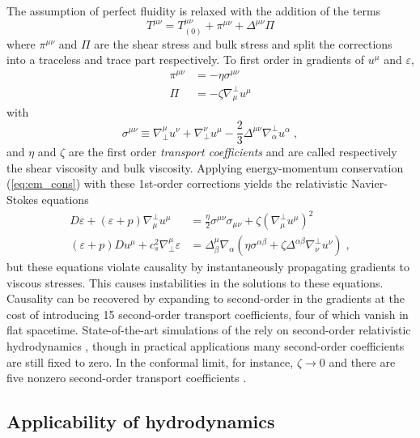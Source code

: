 The assumption of perfect fluidity is relaxed with the addition of the terms
\begin{equation}
T^{\mu\nu} = T^{\mu\nu}_{(0)} + \pi^{\mu\nu} + \Delta^{\mu\nu}\Pi
\end{equation}
where $\pi^{\mu\nu}$ and $\Pi$ are the shear stress and bulk stress and split the corrections into a traceless and trace part respectively.
To first order in gradients of $u^\mu$ and $\varepsilon$,
\begin{align}
  \label{eq:shear_stress}
  \pi^{\mu\nu} &= - \eta \sigma^{\mu\nu} \\
  \label{eq:bulk_stress}
  \Pi          &= - \zeta \nabla^\perp_\mu u^\mu
\end{align}
with
\begin{equation}
  \label{eq:sigma_tensor}
  \sigma^{\mu\nu} \equiv \nabla_\perp^\mu u^\nu + \nabla_\perp^\nu u^\mu - \frac{2}{3} \Delta^{\mu\nu}\nabla^\perp_\alpha u^\alpha \; ,
\end{equation}
and $\eta$ and $\zeta$ are the first order \emph{transport coefficients} and are called respectively the shear viscosity and bulk viscosity.
Applying energy-momentum conservation (\cref{eq:em_cons}) with these 1st-order corrections yields the relativistic Navier-Stokes equations
\begin{align}
  D\varepsilon + \left(\varepsilon + p\right)\nabla^\perp_\mu u^\mu &= \frac{\eta}{2}\sigma^{\mu\nu}\sigma_{\mu\nu} + \zeta \left( \nabla^\perp_\mu u^\mu \right)^2 \\
  \left(\varepsilon + p\right)Du^\mu + c_s^2 \nabla_\perp^\mu \varepsilon &= \Delta^\mu_\beta \nabla_\alpha \left( \eta \sigma^{\alpha\beta} + \zeta \Delta^{\alpha\beta} \nabla^\perp_\nu u^\nu \right) \;,
\end{align}
but these equations violate causality by instantaneously propagating gradients to viscous stresses.
This causes instabilities in the solutions to these equations.
Causality can be recovered by expanding to second-order in the gradients \cite{Israel:1976tn} at the cost of introducing 15 second-order transport coefficients, four of which vanish in flat spacetime.
State-of-the-art simulations of the \qgp rely on second-order relativistic hydrodynamics \cite{Israel:1979wp}, though in practical applications many second-order coefficients are still fixed to zero.
In the conformal limit, for instance, $\zeta \rightarrow 0$ and there are five nonzero second-order transport coefficients \cite{Baier:2007ix}.

\subsection{Applicability of hydrodynamics}

